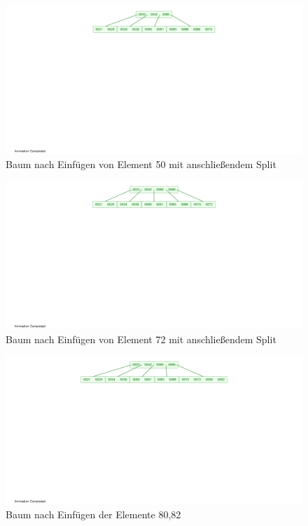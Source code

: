 \documentclass[12pt]{scrartcl}
\begin{document}
\begin{figure}[h!]
\begin{center}
\includegraphics[scale=1]{B-Tree6.png}
\caption{Baum nach Einfügen von Element 50 mit anschließendem Split}
\end{center}
\end{figure}

\begin{figure}[h!]
\begin{center}
\includegraphics[scale=1]{B-Tree7.png}
\caption{Baum nach Einfügen von Element 72 mit anschließendem Split}
\end{center}
\end{figure}

\begin{figure}[h!]
\begin{center}
\includegraphics[scale=1]{B-Tree8.png}
\caption{Baum nach Einfügen der Elemente 80,82}
\end{center}
\end{figure}
\end{document}

